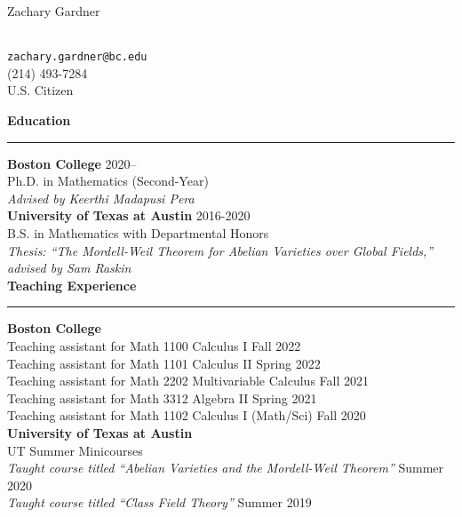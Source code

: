 \documentclass[11pt]{article}
\newenvironment{mysection}{
\color{mygreen}\bfseries\large
}
{
\\ \rule{\textwidth}{1pt}\hspace{-.25em}
} %
\begin{document}
\begin{center}
\begin{LARGE}Zachary Gardner\end{LARGE} \\
\vspace{1em}
\texttt{zachary.gardner@bc.edu} \\
(214) 493-7284 \\
U.S. Citizen \\
\end{center}

\begin{mysection}Education\end{mysection}
\textbf{Boston College} \hfill 2020-- \\
Ph.D. in Mathematics (Second-Year) \\
\textit{Advised by Keerthi Madapusi Pera} \\

\textbf{University of Texas at Austin} \hfill 2016-2020 \\
B.S. in Mathematics with Departmental Honors \\
\textit{Thesis: ``The Mordell-Weil Theorem for Abelian Varieties over Global Fields,'' advised by Sam Raskin} \\

\begin{mysection}Teaching Experience\end{mysection}
\textbf{Boston College} \\
Teaching assistant for Math 1100 Calculus I \hfill Fall 2022 \\
Teaching assistant for Math 1101 Calculus II \hfill Spring 2022 \\
Teaching assistant for Math 2202 Multivariable Calculus \hfill Fall 2021 \\
Teaching assistant for Math 3312 Algebra II \hfill Spring 2021 \\
Teaching assistant for Math 1102 Calculus I (Math/Sci) \hfill Fall 2020 \\

\textbf{University of Texas at Austin} \\
UT Summer Minicourses \\
\textit{Taught course titled ``Abelian Varieties and the Mordell-Weil Theorem''} \hfill Summer 2020 \\
\textit{Taught course titled ``Class Field Theory''} \hfill Summer 2019 \\
\end{document}
